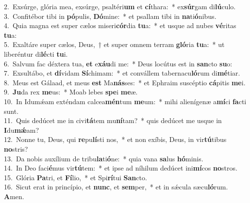 {2.~}Exsúrge, glória mea, exsúrge, psaltéri\textbf{um} et \textbf{cí}thara:~* ex\textbf{súr}gam di\textbf{lú}culo.\\
{3.~}Confitébor tibi in \textbf{pó}pulis, \textbf{Dó}mine:~* et psallam tibi in \textbf{na}ti\textbf{ó}nibus.\\
{4.~}Quia magna est super cælos miseri\textbf{cór}dia \textbf{tu}a:~* et usque ad nubes \textbf{vé}ritas \textbf{tu}a:\\
{5.~}Exaltáre super cælos, Deus,~† et super omnem terram \textbf{gló}ria \textbf{tu}a:~* ut liberéntur di\textbf{lé}cti \textbf{tu}i.\\
{6.~}Salvum fac déxtera tua, \textbf{et} e\textbf{xáu}di me:~* Deus locútus est in \textbf{san}cto \textbf{su}o:\\
{7.~}Exsultábo, et \textbf{dí}vidam \textbf{Sí}chimam:~* et convállem tabernacu\textbf{ló}rum di\textbf{mé}tiar.\\
{8.~}Meus est Gálaad, et meus \textbf{est} Ma\textbf{nás}ses:~* et Ephraim suscéptio \textbf{cá}pitis \textbf{me}i.\\
{9.~}\textbf{Ju}da rex \textbf{me}us:~* Moab lebes \textbf{spe}i \textbf{me}æ.\\
{10.~}In Idumǽam exténdam calcea\textbf{mén}tum \textbf{me}um:~* mihi alienígenæ a\textbf{mí}ci \textbf{fa}cti sunt.\\
{11.~}Quis dedúcet me in civi\textbf{tá}tem mu\textbf{ní}tam?~* quis dedúcet me usque in \textbf{I}du\textbf{mǽ}am?\\
{12.~}Nonne tu, Deus, qui \textbf{re}pu\textbf{lí}sti nos,~* et non exíbis, Deus, in vir\textbf{tú}tibus \textbf{no}stris?\\
{13.~}Da nobis auxílium de tribu\textbf{la}ti\textbf{ó}ne:~* quia vana \textbf{sa}lus \textbf{hó}minis.\\
{14.~}In Deo faci\textbf{é}mus vir\textbf{tú}tem:~* et ipse ad níhilum dedúcet ini\textbf{mí}cos \textbf{no}stros.\\
{15.~}Glória \textbf{Pa}tri, et \textbf{Fí}lio,~* et Spi\textbf{rí}tui \textbf{San}cto.\\
{16.~}Sicut erat in princípio, et \textbf{nunc}, et \textbf{sem}per,~* et in sǽcula sæcu\textbf{ló}rum. \textbf{A}men.\\
